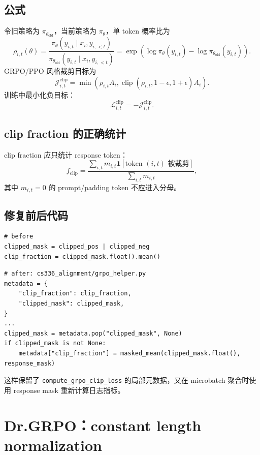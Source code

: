 \documentclass[UTF8,a4paper,11pt]{ctexart}
\begin{document}
\subsection{公式}

令旧策略为 $\pi_{\theta_{\mathrm{old}}}$，当前策略为 $\pi_\theta$，单 token 概率比为
\[
  \rho_{i,t}(\theta)
  =
  \frac{\pi_\theta(y_{i,t}\mid x_i,y_{i,<t})}
       {\pi_{\theta_{\mathrm{old}}}(y_{i,t}\mid x_i,y_{i,<t})}
  =
  \exp\left(
    \log\pi_\theta(y_{i,t})-\log\pi_{\theta_{\mathrm{old}}}(y_{i,t})
  \right).
\]
GRPO/PPO 风格裁剪目标为
\[
  \mathcal{J}_{i,t}^{\mathrm{clip}}
  =
  \min\left(
    \rho_{i,t} A_i,
    \operatorname{clip}(\rho_{i,t},1-\epsilon,1+\epsilon)A_i
  \right).
\]
训练中最小化负目标：
\[
  \mathcal{L}_{i,t}^{\mathrm{clip}}
  =
  -\mathcal{J}_{i,t}^{\mathrm{clip}}.
\]

\subsection{clip fraction 的正确统计}

clip fraction 应只统计 response token：
\[
  f_{\mathrm{clip}}
  =
  \frac{\sum_{i,t}m_{i,t}\mathbf{1}[\text{token }(i,t)\text{ 被裁剪}]}
       {\sum_{i,t}m_{i,t}},
\]
其中 $m_{i,t}=0$ 的 prompt/padding token 不应进入分母。

\subsection{修复前后代码}

\begin{lstlisting}
# before
clipped_mask = clipped_pos | clipped_neg
clip_fraction = clipped_mask.float().mean()
\end{lstlisting}

\begin{lstlisting}
# after: cs336_alignment/grpo_helper.py
metadata = {
    "clip_fraction": clip_fraction,
    "clipped_mask": clipped_mask,
}
...
clipped_mask = metadata.pop("clipped_mask", None)
if clipped_mask is not None:
    metadata["clip_fraction"] = masked_mean(clipped_mask.float(), response_mask)
\end{lstlisting}

这样保留了 \texttt{compute\_grpo\_clip\_loss} 的局部元数据，又在 microbatch 聚合时使用 response mask 重新计算日志指标。

\section{Dr.GRPO：constant length normalization}
\end{document}
